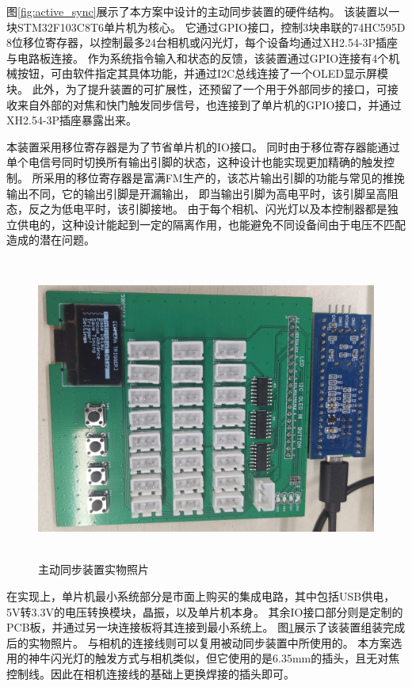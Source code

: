 图\ref{fig:active_sync}展示了本方案中设计的主动同步装置的硬件结构。
该装置以一块STM32F103C8T6单片机为核心。
它通过GPIO接口，控制3块串联的74HC595D 8位移位寄存器，以控制最多24台相机或闪光灯，每个设备均通过XH2.54-3P插座与电路板连接。
作为系统指令输入和状态的反馈，该装置通过GPIO连接有4个机械按钮，可由软件指定其具体功能，并通过I2C总线连接了一个OLED显示屏模块。
此外，为了提升装置的可扩展性，还预留了一个用于外部同步的接口，可接收来自外部的对焦和快门触发同步信号，也连接到了单片机的GPIO接口，并通过XH2.54-3P插座暴露出来。

本装置采用移位寄存器是为了节省单片机的IO接口。
同时由于移位寄存器能通过单个电信号同时切换所有输出引脚的状态，这种设计也能实现更加精确的触发控制。
所采用的移位寄存器是富满FM生产的，该芯片输出引脚的功能与常见的推挽输出不同，它的输出引脚是开漏输出，
即当输出引脚为高电平时，该引脚呈高阻态，反之为低电平时，该引脚接地。
由于每个相机、闪光灯以及本控制器都是独立供电的，这种设计能起到一定的隔离作用，也能避免不同设备间由于电压不匹配造成的潜在问题。

\begin{figure}
\centering
\includegraphics[height=10cm]{figures/active_sync_photo.jpg}
\caption{主动同步装置实物照片}
\label{fig:active_sync_photo}
\end{figure}

在实现上，单片机最小系统部分是市面上购买的集成电路，其中包括USB供电，5V转3.3V的电压转换模块，晶振，以及单片机本身。
其余IO接口部分则是定制的PCB板，并通过另一块连接板将其连接到最小系统上。
图\ref{fig:active_sync_photo}展示了该装置组装完成后的实物照片。
与相机的连接线则可以复用被动同步装置中所使用的。
本方案选用的神牛闪光灯的触发方式与相机类似，但它使用的是6.35mm的插头，且无对焦控制线。因此在相机连接线的基础上更换焊接的插头即可。

